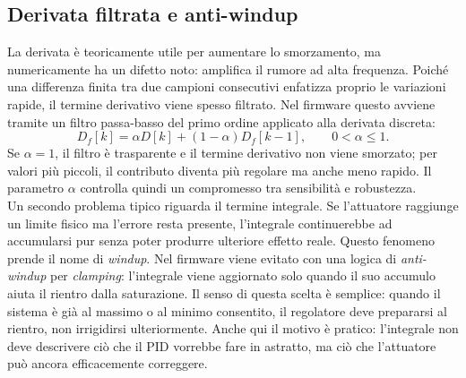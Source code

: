 \documentclass[11pt]{report}
\begin{document}
	\subsection{Derivata filtrata e anti-windup}
	La derivata è teoricamente utile per aumentare lo smorzamento, ma numericamente ha un difetto noto: amplifica il rumore ad alta frequenza. Poiché una differenza finita tra due campioni consecutivi enfatizza proprio le variazioni rapide, il termine derivativo viene spesso filtrato. Nel firmware questo avviene tramite un filtro passa-basso del primo ordine applicato alla derivata discreta:
	\begin{equation}
		D_f[k]=\alpha D[k] + (1-\alpha)D_f[k-1], \qquad 0<\alpha\leq 1.
	\end{equation}
	Se $\alpha=1$, il filtro è trasparente e il termine derivativo non viene smorzato; per valori più piccoli, il contributo diventa più regolare ma anche meno rapido. Il parametro $\alpha$ controlla quindi un compromesso tra sensibilità e robustezza.\\
	Un secondo problema tipico riguarda il termine integrale. Se l'attuatore raggiunge un limite fisico ma l'errore resta presente, l'integrale continuerebbe ad accumularsi pur senza poter produrre ulteriore effetto reale. Questo fenomeno prende il nome di \textit{windup}. Nel firmware viene evitato con una logica di \textit{anti-windup} per \textit{clamping}: l'integrale viene aggiornato solo quando il suo accumulo aiuta il rientro dalla saturazione. Il senso di questa scelta è semplice: quando il sistema è già al massimo o al minimo consentito, il regolatore deve prepararsi al rientro, non irrigidirsi ulteriormente. Anche qui il motivo è pratico: l'integrale non deve descrivere ciò che il PID vorrebbe fare in astratto, ma ciò che l'attuatore può ancora efficacemente correggere.
	
	
	
\end{document}
